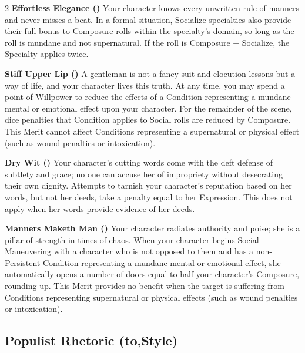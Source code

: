 \begin{multicols}{2}
\textbf{Effortless Elegance (\textbullet\textbullet)} Your character knows every unwritten rule of manners and never misses a beat. In a formal situation, Socialize specialties also provide their full bonus to Composure rolls within the specialty's domain, so long as the roll is mundane and not supernatural. If the roll is Composure + Socialize, the Specialty applies twice. 

\textbf{Stiff Upper Lip (\textbullet\textbullet\textbullet)} A gentleman is not a fancy suit and elocution lessons but a way of life, and your character lives this truth. At any time, you may spend a point of Willpower to reduce the effects of a Condition representing a mundane mental or emotional effect upon your character. For the remainder of the scene, dice penalties that Condition applies to Social rolls are reduced by Composure. This Merit cannot affect Conditions representing a supernatural or physical effect (such as wound penalties or intoxication).

\textbf{Dry Wit (\textbullet\textbullet\textbullet\textbullet)} Your character's cutting words come with the deft defense of subtlety and grace; no one can accuse her of impropriety without desecrating their own dignity. Attempts to tarnish your character's reputation based on her words, but not her deeds, take a penalty equal to her Expression. This does not apply when her words provide evidence of her deeds. 

\textbf{Manners Maketh Man (\textbullet\textbullet\textbullet\textbullet\textbullet)} Your character radiates authority and poise; she is a pillar of strength in times of chaos. When your character begins Social Maneuvering with a character who is not opposed to them and has a non-Persistent Condition representing a mundane mental or emotional effect, she automatically opens a number of doors equal to half your character's Composure, rounding up. This Merit provides no benefit when the target is suffering from Conditions representing supernatural or physical effects (such as wound penalties or intoxication).

\subsection*{Populist Rhetoric (\textbullet\nobreak\hspace{.16667em}to\nobreak\hspace{.16667em}\textbullet\textbullet\textbullet\textbullet\textbullet,\nobreak\hspace{.16667em}Style)}


\end{multicols}
